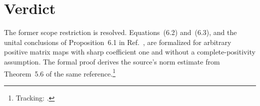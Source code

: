 \documentclass{article}
\begin{document}
\section{Verdict}

The former scope restriction is resolved. Equations~(6.2) and~(6.3), and the
unital conclusions of Proposition~6.1 in
Ref.~\cite{Wolf2012Quantum}, are formalized for arbitrary positive matrix
maps with sharp coefficient one and without a complete-positivity assumption.
The formal proof derives the source's norm estimate from Theorem~5.6 of the
same reference.\footnote{Tracking: .}



\end{document}
